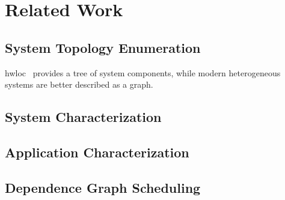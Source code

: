 \chapter{Related Work}

\section{System Topology Enumeration}

hwloc~\cite{broquedis2010hwloc} provides a tree of system components, while modern heterogeneous systems are better described as a graph.


\section{System Characterization}


\section{Application Characterization}


\section{Dependence Graph Scheduling}